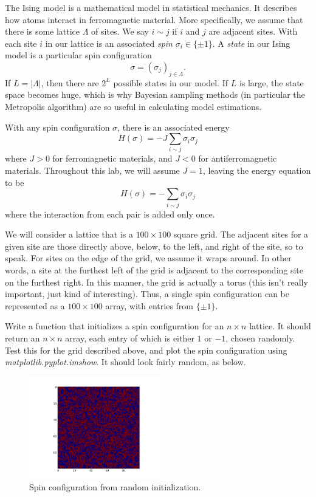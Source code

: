 

The Ising model is a mathematical model in statistical mechanics. It describes how atoms interact in ferromagnetic material. More specifically, we assume that there is some lattice $\Lambda$ of sites. We say $i \sim j$ if $i$ and $j$ are adjacent sites. With each site $i$ in our lattice is an associated \emph{spin} $\sigma_{i} \in \{\pm 1\}$. A \emph{state} in our Ising model is a particular spin configuration $$\sigma = (\sigma_{j})_{j \in \Lambda}.$$ If $L = |\Lambda|$, then there are $2^{L}$ possible states in our model. If $L$ is large, the state space becomes huge, which is why Bayesian sampling methods (in particular the Metropolis algorithm) are so useful in calculating model estimations.

With any spin configuration $\sigma$, there is an associated energy $$H(\sigma) = -J \sum_{i \sim j} \sigma_{i} \sigma_{j}$$ where $J > 0$ for ferromagnetic materials, and $J < 0$ for antiferromagnetic materials. Throughout this lab, we will assume $J = 1$, leaving the energy equation to be $$H(\sigma) = -\sum_{i \sim j} \sigma_{i}\sigma_{j}$$ where the interaction from each pair is added only once.

We will consider a lattice that is a $100 \times 100$ square grid. The adjacent sites for a given site are those directly above, below, to the left, and right of the site, so to speak. For sites on the edge of the grid, we assume it wraps around. In other words, a site at the furthest left of the grid is adjacent to the corresponding site on the furthest right. In this manner, the grid is actually a torus (this isn't really important, just kind of interesting). Thus, a single spin configuration can be represented as a $100 \times 100$ array, with entries from $\{\pm 1\}$.

\begin{problem}
Write a function that initializes a spin configuration for an $n \times n$ lattice. It should return an $n \times n$ array, each entry of which is either $1$ or $-1$, chosen randomly. Test this for the grid described above, and plot the spin configuration using \emph{matplotlib.pyplot.imshow}. It should look fairly random, as below.
\end{problem}

\begin{figure}
\begin{center}
\includegraphics[height=1.75in]{initialization.jpeg}
\end{center}
\caption{Spin configuration from random initialization.}
\end{figure}

